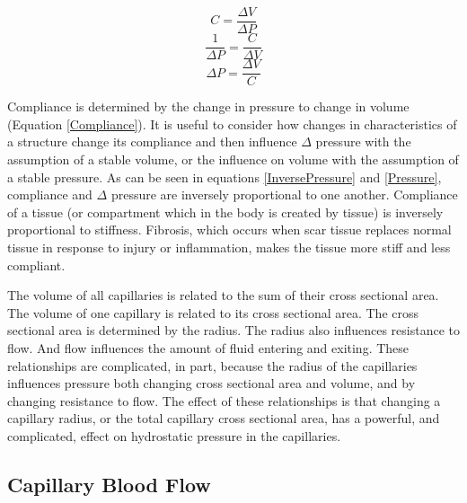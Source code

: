 \begin{equation}
    C = \frac{\Delta V}{\Delta P}
    \label{Compliance}
\end{equation}
\begin{equation}
    \frac{1}{\Delta P} = \frac{C}{\Delta V}
    \label{InversePressure}
\end{equation}
\begin{equation}
    \Delta P = \frac{\Delta V}{C}
    \label{Pressure}
\end{equation}

Compliance is determined by the change in pressure to change in volume (Equation \ref{Compliance}). It is useful to consider how changes in characteristics of a structure change its compliance and then influence $\Delta$ pressure with the assumption of a stable volume, or the influence on volume with the assumption of a stable pressure. As can be seen in equations \ref{InversePressure} and \ref{Pressure}, compliance and $\Delta$ pressure are inversely proportional to one another. Compliance of a tissue (or compartment which in the body is created by tissue) is inversely proportional to stiffness. Fibrosis, which occurs when scar tissue replaces normal tissue in response to injury or inflammation, makes the tissue more stiff and less compliant.

The volume of all capillaries is related to the sum of their cross sectional area. The volume of one capillary is related to its cross sectional area. The cross sectional area is determined by the radius. The radius also influences resistance to flow. And flow influences the amount of fluid entering and exiting. These relationships are complicated, in part, because the radius of the capillaries influences pressure both changing cross sectional area and volume, and by changing resistance to flow. The effect of these relationships is that changing a capillary radius, or the total capillary cross sectional area, has a powerful, and complicated, effect on hydrostatic pressure in the capillaries.


\subsection{Capillary Blood Flow}

